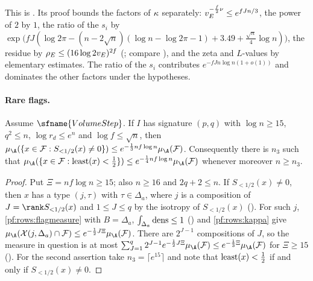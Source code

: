 This is . Its proof bounds the factors of $\kappa$
separately: $v_E^{-\frac f2\nu}\le e^{fJn/3}$, the power of $2$ by $1$, the ratio of the $s_i$ by
$\exp\bigl(fJ(\log2\pi-(n-2\sqrt n)(\log n-\log2\pi-1)+3.49+\frac{\sqrt n}4\log n)\bigr)$, the residue by
$\rho_E\le(16\log 2v_E)^{2f}$ (; compare
\cite{Louboutin2000}), and the zeta and $L$-values by elementary estimates. The ratio of the $s_i$ contributes
$e^{-fJn\log n(1+o(1))}$ and dominates the other factors under the hypotheses.

\paragraph{Rare flags.}

\begin{lemma}\label{pf:rows:rare}
Assume $\sfname{VolumeStep}$. If $I$ has signature $(p,q)$ with $\log n\ge15$, $q^2\le n$, $\log r_d\le e^n$ and
$\log f\le\sqrt n$, then
$\mu_{\A}(\{x\in\mathcal F:S_{<1/2}(x)\ne0\})\le e^{-\frac13nf\log n}\mu_{\A}(\mathcal F)$. Consequently there is $n_3$ such that
$\mu_{\A}(\{x\in\mathcal F:\rowsleast(x)<\frac12\})\le e^{-\frac14nf\log n}\mu_{\A}(\mathcal F)$ whenever moreover $n\ge n_3$.
\end{lemma}

\begin{proof}
Put $\Xi=nf\log n\ge15$; also $n\ge16$ and $2q+2\le n$. If $S_{<1/2}(x)\ne0$, then $x$ has a type $(j,\tau)$ with
$\tau\in\Delta_a$, where $j$ is a composition of $J=\rank S_{<1/2}(x)$ and $1\le J\le q$ by the isotropy of $S_{<1/2}(x)$
(). For such $j$, \cref{pf:rows:flagmeasure} with $B=\Delta_a$,
$\int_{\Delta_a}\operatorname{dens}\le1$ () and \cref{pf:rows:kappa} give
$\mu_{\A}(\mathcal X(j,\Delta_a)\cap\mathcal F)\le e^{-\frac12J\Xi}\mu_{\A}(\mathcal F)$. There are $2^{J-1}$ compositions of $J$,
so the measure in question is at most $\sum_{J=1}^q2^{J-1}e^{-\frac12J\Xi}\mu_{\A}(\mathcal F)\le e^{-\frac13\Xi}\mu_{\A}(\mathcal F)$
for $\Xi\ge15$ (). For the second assertion take
$n_3=\lceil e^{15}\rceil$ and note that $\operatorname{least}(x)<\frac12$ if and only if $S_{<1/2}(x)\ne0$.
\end{proof}

